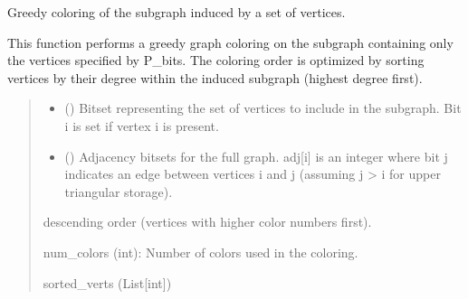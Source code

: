 \documentclass[letterpaper,10pt,english]{sphinxmanual}
\begin{document}
\begin{fulllineitems}
\label{\detokenize{index:hammindist.functions.greedy_color}}
\pysigstartsignatures
\pysiglinewithargsret
{}
{\sphinxparamcomma {}}
{}
\pysigstopsignatures
\sphinxAtStartPar
Greedy coloring of the subgraph induced by a set of vertices.

\sphinxAtStartPar
This function performs a greedy graph coloring on the subgraph containing
only the vertices specified by P\_bits. The coloring order is optimized
by sorting vertices by their degree within the induced subgraph (highest
degree first).
\begin{quote}\begin{description}
\begin{itemize}
\item {} 
\sphinxAtStartPar
{} () \textendash{} Bitset representing the set of vertices to include in the
subgraph. Bit i is set if vertex i is present.

\item {} 
\sphinxAtStartPar
{} (\sphinxstyleliteralemphasis{\sphinxupquote{{[}}}\sphinxstyleliteralemphasis{\sphinxupquote{{]}}}) \textendash{} Adjacency bitsets for the full graph. adj{[}i{]} is an
integer where bit j indicates an edge between vertices
i and j (assuming j \textgreater{} i for upper triangular storage).

\end{itemize}

\sphinxAtStartPar
\begin{description}
\sphinxAtStartPar
descending order (vertices with higher color numbers first).

\end{description}

\sphinxAtStartPar
num\_colors (int): Number of colors used in the coloring.


\sphinxAtStartPar
sorted\_verts (List{[}int{]})

\end{description}\end{quote}

\end{fulllineitems}
\end{document}
